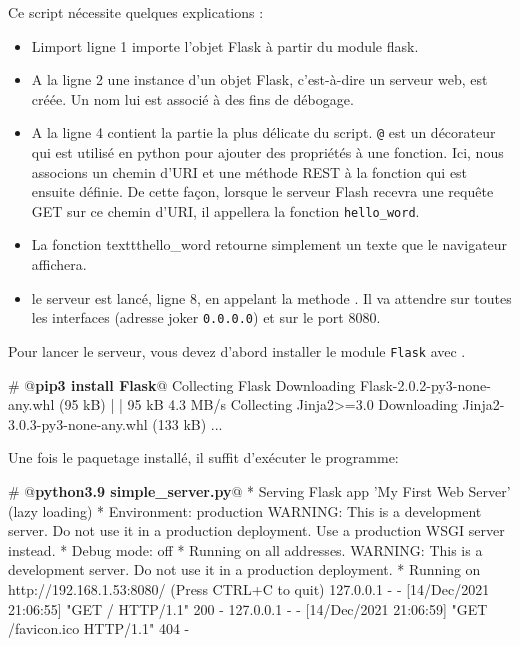  
 Ce script nécessite quelques explications :

\begin{itemize}
    \item Limport ligne 1 importe l'objet Flask à partir du module flask.
    \item A la ligne 2 une instance d'un objet Flask, c'est-à-dire un serveur web, est créée. Un nom lui est associé à des fins de débogage.
    \item A la ligne 4 contient la partie la plus délicate du script. \texttt{@} est un décorateur qui est utilisé en python pour ajouter des propriétés à une fonction. Ici, nous associons un chemin d'URI et une méthode REST à la fonction qui est ensuite définie. De cette façon, lorsque le serveur Flash recevra une requête GET sur ce chemin d'URI, il appellera la fonction \texttt{hello\_word}.
    \item La fonction texttt{hello\_word} retourne simplement un texte que le navigateur affichera.
    \item le serveur est lancé, ligne 8, en appelant la methode . Il va attendre sur toutes les interfaces (adresse joker \texttt{0.0.0.0}) et sur le port 8080. 
\end{itemize}

  \vspace{1em}

Pour lancer le serveur, vous devez d'abord installer le module \texttt{Flask} avec \texttt{}.

\begin{termc}[backgroundcolor=\color{palerod}, language=json, basicstyle=\small, escapechar=@]
# @\textbf{pip3 install Flask}@
Collecting Flask
  Downloading Flask-2.0.2-py3-none-any.whl (95 kB)
     |                                  | 95 kB 4.3 MB/s 
Collecting Jinja2>=3.0
  Downloading Jinja2-3.0.3-py3-none-any.whl (133 kB)
...
\end{termc}

  \vspace{1em}

Une fois le paquetage installé, il suffit d'exécuter le programme:
\begin{termc}[backgroundcolor=\color{palerod}, language=json, basicstyle=\small, escapechar=@]
# @\textbf{python3.9 simple\_server.py}@
 * Serving Flask app 'My First Web Server' (lazy loading)
 * Environment: production
   WARNING: This is a development server. Do not use it in a production
   deployment.
   Use a production WSGI server instead.
 * Debug mode: off
 * Running on all addresses.
   WARNING: This is a development server. Do not use it in a production
   deployment.
 * Running on http://192.168.1.53:8080/ (Press CTRL+C to quit)
127.0.0.1 - - [14/Dec/2021 21:06:55] "GET / HTTP/1.1" 200 -
127.0.0.1 - - [14/Dec/2021 21:06:59] "GET /favicon.ico HTTP/1.1" 404 -
\end{termc}



